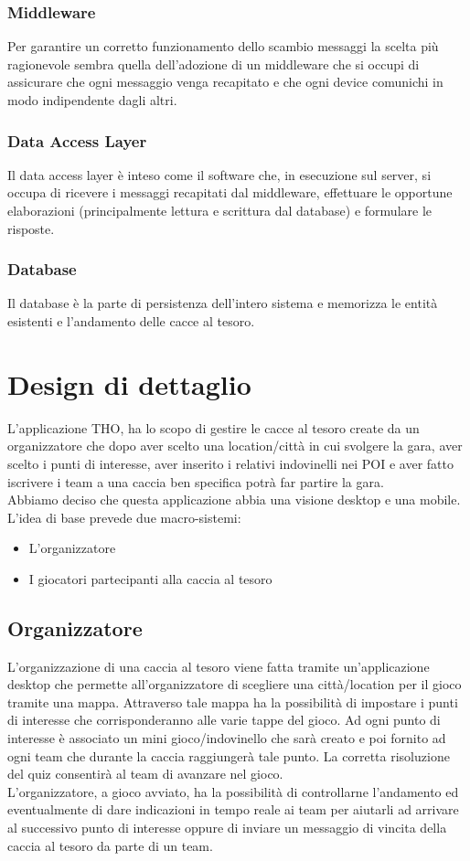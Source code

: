 \documentclass[12pt, italian]{article}
\begin{document}
\subsubsection{Middleware}
Per garantire un corretto funzionamento dello scambio messaggi la scelta più ragionevole sembra quella dell'adozione di un middleware che si occupi di assicurare che ogni messaggio venga recapitato e che ogni device comunichi in modo indipendente dagli altri.
\subsubsection{Data Access Layer}
Il data access layer è inteso come il software che, in esecuzione sul server, si occupa di ricevere i messaggi recapitati dal middleware, effettuare le opportune elaborazioni (principalmente lettura e scrittura dal database) e formulare le risposte.
\subsubsection{Database}
Il database è la parte di persistenza dell'intero sistema e memorizza le entità esistenti e l'andamento delle cacce al tesoro.

\section{Design di dettaglio}
L'applicazione THO, ha lo scopo di gestire le cacce al tesoro create da un organizzatore che dopo aver scelto una location/città in cui svolgere la gara, aver scelto i punti di interesse, aver inserito i relativi indovinelli nei POI e aver fatto iscrivere i team a una caccia ben specifica potrà far partire la gara.
\\Abbiamo deciso che questa applicazione abbia una visione desktop e una mobile.
L’idea di base prevede due macro-sistemi:
\begin{itemize}
	\item L'organizzatore
	\item I giocatori partecipanti alla caccia al tesoro
\end{itemize}
\subsection{Organizzatore}
L’organizzazione di una caccia al tesoro viene fatta tramite un’applicazione desktop che permette all'organizzatore di scegliere una città/location per il gioco tramite una mappa. Attraverso tale mappa ha la possibilità di impostare i punti di interesse che corrisponderanno alle varie tappe del gioco. Ad ogni punto di interesse è associato un mini gioco/indovinello che sarà creato e poi fornito ad ogni team che durante la caccia raggiungerà tale punto. La corretta risoluzione del quiz consentirà al team di avanzare nel gioco.\\
L'organizzatore, a gioco avviato, ha la possibilità di controllarne l'andamento ed eventualmente di dare indicazioni in tempo reale ai team per aiutarli ad arrivare al successivo punto di interesse oppure di inviare un messaggio di vincita della caccia al tesoro da parte di un team.\\
\end{document}
